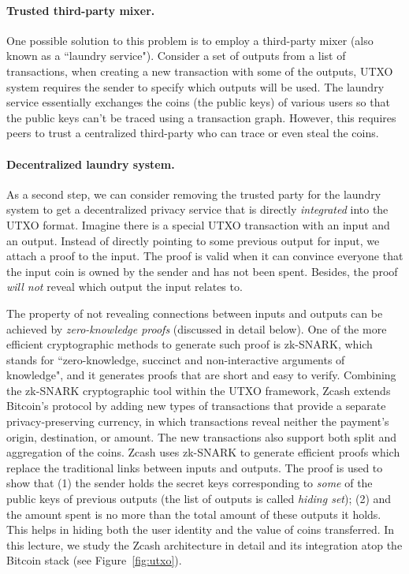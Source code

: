 \documentclass[a4paper]{article}
\begin{document}
\paragraph{Trusted third-party mixer.} 
One possible solution to this problem is to employ a third-party mixer (also known as a ``laundry service"). Consider a set of outputs from a list of transactions, when creating a new transaction with some of the outputs, UTXO system requires the sender to specify which outputs will be used. The laundry service essentially exchanges the coins (the public keys) of various users so that the public keys can't be traced using a transaction graph. However, this requires peers to trust a centralized third-party who can trace or even steal the coins. 

\paragraph{Decentralized laundry system.}  As a second step, we can consider removing the trusted party for the laundry system to get a decentralized privacy service that is  directly {\em integrated} into the UTXO format. Imagine there is a special UTXO transaction with an input and an output. Instead of directly pointing to some previous output for input, we attach a proof to the input. The proof is valid when it can convince everyone that the input coin is owned by the sender and has not been spent. Besides, the proof {\em will not} reveal which output the input relates to.


The property of not revealing connections between inputs and outputs can be achieved by {\em zero-knowledge proofs} (discussed in detail below). 
One of the more efficient cryptographic methods to generate such proof is zk-SNARK\cite{ben2014succinct}, which stands for ``zero-knowledge, succinct and non-interactive arguments of knowledge", and it generates proofs that are short and easy to verify. Combining the zk-SNARK cryptographic tool within the UTXO framework,  Zcash\cite{sasson2014zerocash} extends Bitcoin's protocol by adding new types of transactions that provide a separate privacy-preserving currency, in which transactions reveal neither the payment's origin, destination, or amount. The new transactions also support both split and aggregation of the coins. Zcash uses zk-SNARK to generate efficient proofs which replace the traditional links between inputs and outputs. The proof is used to show that (1) the sender holds the secret keys corresponding to {\em some} of the public keys of previous outputs (the list of outputs is called {\em hiding set}); (2) and the amount spent is no more than the total amount of these outputs it holds.
This helps in hiding both the user identity and the value of coins transferred.  In this lecture, we  study the Zcash architecture in detail and its integration atop the Bitcoin stack (see Figure~\ref{fig:utxo}).
\end{document}
